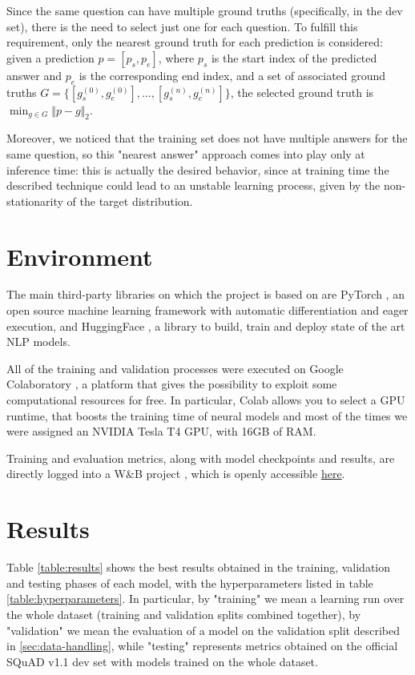 \documentclass[a4paper,10pt]{report}
\begin{document}
Since the same question can have multiple ground truths (specifically, in the dev set), there is the need to select just one for each question. To fulfill this requirement, only the nearest ground truth for each prediction is considered: given a prediction $p=[p_s, p_e]$, where $p_s$ is the start index of the predicted answer and $p_e$ is the corresponding end index, and a set of associated ground truths $G=\{[g_s^{(0)},g_e^{(0)}], \dots, [g_s^{(n)},g_e^{(n)}]\}$, the selected ground truth is $\min_{g\in G}\Vert p - g\Vert_2$.

Moreover, we noticed that the training set does not have multiple answers for the same question, so this "nearest answer" approach comes into play only at inference time: this is actually the desired behavior, since at training time the described technique could lead to an unstable learning process, given by the non-stationarity of the target distribution.

\section{Environment}
The main third-party libraries on which the project is based on are PyTorch \cite{pytorch}, an open source machine learning framework with automatic differentiation and eager execution, and HuggingFace \cite{hugginface}, a library to build, train and deploy state of the art NLP models.

All of the training and validation processes were executed on Google Colaboratory \cite{colab}, a platform that gives the possibility to exploit some computational resources for free. In particular, Colab allows you to select a GPU runtime, that boosts the training time of neural models and most of the times we were assigned an NVIDIA Tesla T4 GPU, with 16GB of RAM.

Training and evaluation metrics, along with model checkpoints and results, are directly logged into a W\&B project \cite{wandb}, which is openly accessible \href{https://wandb.ai/wadaboa/squad-qa}{here}.

\section{Results}
Table \ref{table:results} shows the best results obtained in the training, validation and testing phases of each model, with the hyperparameters listed in table \ref{table:hyperparameters}. In particular, by "training" we mean a learning run over the whole dataset (training and validation splits combined together), by "validation" we mean the evaluation of a model on the validation split described in \ref{sec:data-handling}, while "testing" represents metrics obtained on the official SQuAD v1.1 dev set with models trained on the whole dataset.
\end{document}
